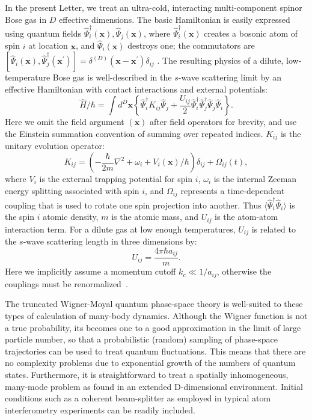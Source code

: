 \documentclass[aps,prl,twocolumn,showpacs,amsmath,amssymb,superscriptaddress]{revtex4-1}
\newcommand{\xvec}{\boldsymbol{x}}
\begin{document}
In the present Letter, we treat an ultra-cold,
interacting multi-component spinor Bose gas in $D$ effective dimensions.
The basic Hamiltonian is easily expressed using quantum fields
$\widehat{\Psi}_{i}^{\dagger}(\xvec),\widehat{\Psi}_{j}(\xvec)$,
where $\widehat{\Psi}_{i}^{\dagger}(\xvec)$ creates a bosonic atom of spin $i$
at location $\xvec$, and $\widehat{\Psi}_{i}(\xvec)$ destroys one;
the commutators are
$[\widehat{\Psi}_{i}(\xvec),\widehat{\Psi}_{j}^{\dagger}(\xvec^\prime)] =
\delta^{(D)}(\xvec-\xvec^\prime)\delta_{ij}\,\,.$
The resulting physics of a dilute, low-temperature Bose gas
is well-described in the $s$-wave scattering limit by an effective Hamiltonian
with contact interactions and external potentials:
\begin{equation}
	\hat{H} / \hbar = \int d^{D}\xvec \left\{
		\widehat{\Psi}_{i}^{\dagger} K_{ij} \widehat{\Psi}_{j} +
		\frac{U_{ij}}{2} \widehat{\Psi}_{i}^{\dagger} \widehat{\Psi}_{j}^{\dagger}
		\widehat{\Psi}_{j} \widehat{\Psi}_{i}
	\right\}.
\end{equation}
Here we omit the field argument $(\xvec)$ after field operators for brevity,
and use the Einstein summation convention of summing over repeated indices.
$K_{ij}$ is the unitary evolution operator:
\begin{equation}
	K_{ij} = \left( -\frac{\hbar}{2m} \nabla^2 + \omega_i + V_i(\xvec) / \hbar \right) \delta_{ij} +
		\Omega_{ij}(t),
\end{equation}
where $V_{i}$ is the external trapping potential for spin $i$,
$\omega_{i}$ is the internal Zeeman energy splitting associated with spin $i$,
and $\Omega_{ij}$ represents a time-dependent coupling
that is used to rotate one spin projection into another.
Thus $\langle \widehat{\Psi}_{i}^{\dagger} \widehat{\Psi}_{i} \rangle$
is the spin $i$ atomic density, $m$ is the atomic mass,
and $U_{ij}$ is the atom-atom interaction term.
For a dilute gas at low enough temperatures,
$U_{ij}$ is related to the $s$-wave scattering length in three dimensions by:
\begin{equation}
	U_{ij}=\frac{4\pi\hbar a_{ij}}{m}.
\end{equation}
Here we implicitly assume a momentum cutoff $k_{c} \ll 1 / a_{ij}$,
otherwise the couplings must be renormalized~\cite{Sinatra2002}.

The truncated Wigner-Moyal quantum phase-space theory is well-suited
to these types of calculation of many-body dynamics.
Although the Wigner function is not a true probability,
its becomes one to a good approximation in the limit of large particle number,
so that a probabilistic (random) sampling of phase-space trajectories
can be used to treat quantum fluctuations.
This means that there are no complexity problems due to exponential growth
of the numbers of quantum states.
Furthermore, it is straightforward to treat a spatially inhomogeneous,
many-mode problem as found in an extended D-dimensional environment.
Initial conditions such as a coherent beam-splitter
as employed in typical atom interferometry experiments can be readily included.
\end{document}
